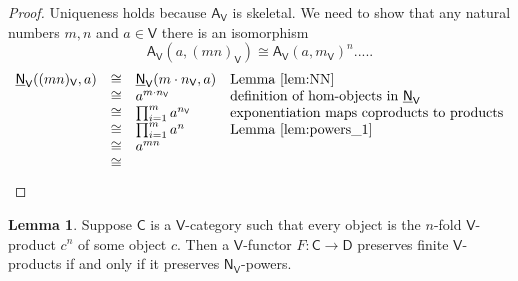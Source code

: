 \documentclass{amsart}
\theoremstyle{definition}
\newtheorem{lemma}[theorem]{Lemma}
\newcommand{\NN}{\mathsf{N}}
\newcommand{\A}{\mathsf{A}}
\newcommand{\V}{\mathsf{V}}
\newcommand{\D}{\mathsf{D}}
\newcommand{\C}{\mathsf{C}}
\newcommand{\maps}{\colon}
\begin{document}
\begin{proof}
Uniqueness holds because $\A_\V$ is skeletal.  We need to show 
that any natural numbers $m,n$ and $a \in \V$ there is an isomorphism
\[     \A_\V(a, (mn)_\V) \cong \A_\V(a,m_\V)^n  .....\]
\[\begin{array}{rcll}
	\underline{\NN}_\V((mn)_\V, a) & \cong & \underline{\NN}_\V(m \cdot n_\V,a) & \text{Lemma \ref{lem:NN}} \\
	&\cong &  a^{m \cdot n_\V} & \text{definition of hom-objects in $\underline{\NN}_\V$} \\
	&\cong & \prod_{i=1}^m a^{n_\V} & \text{exponentiation maps coproducts to products} \\
	&\cong & \prod_{i=1}^m a^n  & \text{Lemma \ref{lem:powers_1}} \\
	&\cong& a^{mn} \\
	&\cong& 
\end{array}
\]
\end{proof}	
\fi

\begin{lemma}
\label{lem:powers_3}
Suppose $\C$ is a $\V$-category such that every object is the $n$-fold $\V$-product $c^n$ of
some object $c$.   Then a $\V$-functor $F \maps \C \to \D$ preserves finite $\V$-products
if and only if it preserves $\NN_\V$-powers.
\end{lemma}
\end{document}
